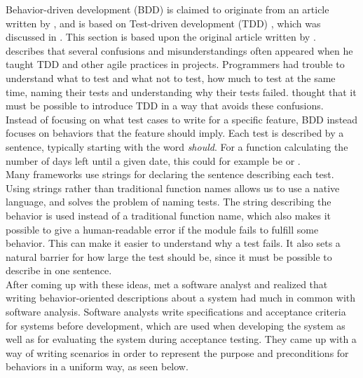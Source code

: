 Behavior-driven development (BDD) is claimed to originate from an
article written by \citet{web:dan_north}, and is based on Test-driven
development (TDD) \cite{wiki:bdd}, which was discussed in
. This section is based upon the original article written
by \citet{web:dan_north}.\\

\citeauthor{web:dan_north} describes that several confusions and
misunderstandings often appeared when he taught TDD and other agile
practices in projects. Programmers had trouble to understand what to
test and what not to test, how much to test at the same time, naming
their tests and understanding why their tests failed.
\citeauthor{web:dan_north} thought that it must be possible to introduce
TDD in a way that avoids these confusions.\\

Instead of focusing on what test cases to write for a specific feature,
BDD instead focuses on behaviors that the feature should imply. Each
test is described by a sentence, typically starting with the word
\emph{should}. For a function calculating the number of days left until
a given date, this could for example be  or .\\

Many frameworks use strings for declaring the sentence describing each
test. Using strings rather than traditional function names allows us to
use a native language, and solves the problem of naming tests. The
string describing the behavior is used instead of a traditional function
name, which also makes it possible to give a human-readable error if the
module fails to fulfill some behavior. This can make it easier to
understand why a test fails. It also sets a natural barrier for how
large the test should be, since it must be possible to describe in one
sentence.\\

After coming up with these ideas, \citeauthor{web:dan_north} met a
software analyst and realized that writing behavior-oriented
descriptions about a system had much in common with software analysis.
Software analysts write specifications and acceptance criteria for
systems before development, which are used when developing the system as
well as for evaluating the system during acceptance testing. They came
up with a way of writing scenarios in order to represent the purpose and
preconditions for behaviors in a uniform way, as seen below.\\

